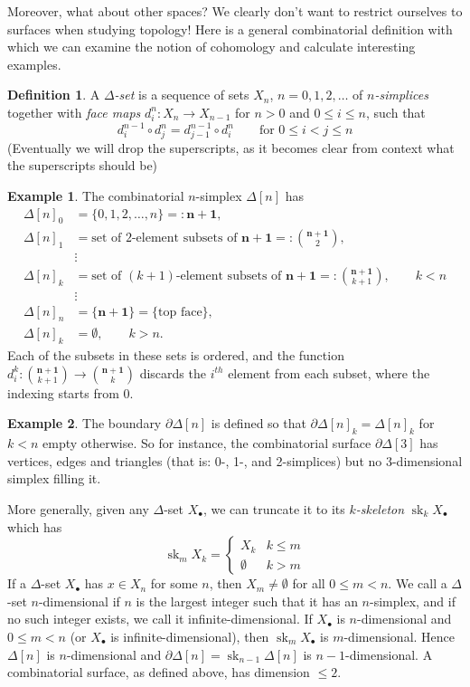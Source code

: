 \documentclass{tufte-handout}
\DeclareMathOperator{\sk}{sk}
\theoremstyle{definition}
\newtheorem{definition}{Definition}
\newtheorem{example}{Example}
\begin{document}
Moreover, what about other spaces? We clearly don't want to restrict ourselves to surfaces 
when studying topology! Here is a general combinatorial definition with which we can examine
the notion of cohomology and calculate interesting examples.

\begin{definition}
A \emph{$\Delta$-set} is a sequence of sets $X_n$, $n=0,1,2,\ldots$ of \emph{$n$-simplices} together
with \emph{face maps} $d_i^n\colon X_n\to X_{n-1}$ for $n>0$ and $0\leq i \leq n$, such that
\[
	d_i^{n-1}\circ d_j^n = d_{j-1}^{n-1} \circ d_i^n \qquad \text{for } 0 \leq i < j \leq n
\]
(Eventually we will drop the superscripts, as it becomes clear from context what the superscripts should be)
\end{definition}

\begin{example}
The combinatorial $n$-simplex $\Delta[n]$ has
\begin{align*}
\Delta[n]_0 & = \{0,1,2,\ldots,n\} =: \mathbf{n+1},\\
\Delta[n]_1 & = \text{set of 2-element subsets of }\mathbf{n+1} =:\binom{\mathbf{n+1}}{2},\\
&\vdots\\
\Delta[n]_k & = \text{set of $(k+1)$-element subsets of }\mathbf{n+1} =: \binom{\mathbf{n+1}}{k+1},\qquad k<n\\
&\vdots\\
\Delta[n]_n & = \{\mathbf{n+1}\} = \{\text{top face}\},\\
\Delta[n]_k & = \emptyset, \qquad k>n.
\end{align*}
Each of the subsets in these sets is ordered, and the function 
$d_i^k\colon\binom{\mathbf{n+1}}{k+1} \to \binom{\mathbf{n+1}}{k}$ discards the $i^{th}$ 
element from each subset, where the indexing starts from $0$.
\end{example}

\begin{example}
The boundary $\partial\Delta[n]$ is defined so that $\partial\Delta[n]_k = \Delta[n]_k$ for $k<n$ 
empty otherwise. So for instance, the combinatorial surface $\partial\Delta[3]$ has vertices,
edges and triangles (that is: 0-, 1-, and 2-simplices) but no 3-dimensional simplex filling it.
\end{example}

More generally, given any $\Delta$-set $X_\bullet$, we can truncate it to its \emph{$k$-skeleton}
$\sk_k X_\bullet$ which has 
\[
	\sk_mX_k = \begin{cases}
			X_k & k \leq m\\
			\emptyset & k > m 
		\end{cases}
\]
If a $\Delta$-set $X_\bullet$ has $x\in X_n$ for some $n$, then $X_m \neq \emptyset$ for all
$0\leq m< n$. We call a $\Delta$-set $n$-dimensional if $n$ is the largest integer such that it
has an $n$-simplex, and if no such integer exists, we call it infinite-dimensional. If $X_\bullet$ 
is $n$-dimensional and $0\leq m < n$ (or $X_\bullet$ is infinite-dimensional), then 
$\sk_mX_\bullet$ is $m$-dimensional. Hence $\Delta[n]$ is $n$-dimensional and 
$\partial\Delta[n] = \sk_{n-1}\Delta[n]$ is $n-1$-dimensional. A combinatorial surface, as defined
above, has dimension $\leq 2$.
\end{document}
